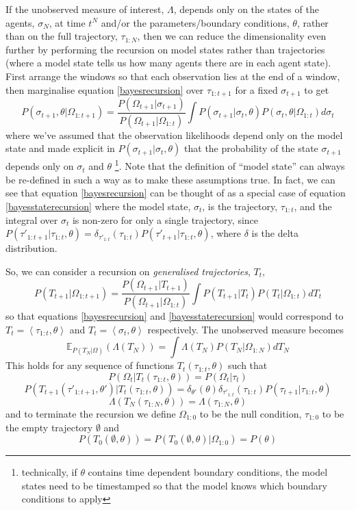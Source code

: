 \documentclass{article}
\begin{document}
If the unobserved measure of interest, $\Lambda$, depends only on the states of the agents, $\sigma_N$, at time $t^N$ and/or the parameters/boundary conditions, $\theta$, rather than on the full trajectory, $\tau_{1:N}$, then we can reduce the dimensionality even further by performing the recursion on model states rather than trajectories (where a model state tells us how many agents there are in each agent state). First arrange the windows so that each observation lies at the end of a window, then marginalise equation \eqref{bayesrecursion} over $\tau_{1:t+1}$ for a fixed $\sigma_{t+1}$ to get
\begin{equation}
P\left(\sigma_{t+1}, \theta | \Omega_{1:t+1}\right)
=
\frac{ P(\Omega_{t+1}|\sigma_{t+1}) 
}
{	P(\Omega_{t+1}| \Omega_{1:t}) }
\int P(\sigma_{t+1}|\sigma_t,\theta)P\left(\sigma_{t},\theta| \Omega_{1:t}\right) d \sigma_t
\label{bayesstaterecursion}
\end{equation}
where we've assumed that the observation likelihoods depend only on the model state and made explicit in $P(\sigma_{t+1}|\sigma_t,\theta)$ that the probability of the state $\sigma_{t+1}$ depends only on $\sigma_t$ and $\theta$  \footnote{technically, if $\theta$ contains time dependent boundary conditions, the model states need to be timestamped so that the model knows which boundary conditions to apply}.   Note that the definition of ``model state'' can always be re-defined in such a way as to make these assumptions true. In fact, we can see that equation \eqref{bayesrecursion} can be thought of as a special case of equation \eqref{bayesstaterecursion} where the model state, $\sigma_t$, is the trajectory, $\tau_{1:t}$, and the integral over $\sigma_t$ is non-zero for only a single trajectory, since $P(\tau'_{1:t+1}|\tau_{1:t},\theta) = \delta_{\tau'_{1:t}}(\tau_{1:t})P(\tau'_{t+1}|\tau_{1:t},\theta)$, where $\delta$ is the delta distribution.

So, we can consider a recursion on \textit{generalised trajectories}, $T_t$,
\begin{equation}
P\left(T_{t+1}| \Omega_{1:t+1}\right)
=
\frac{ P(\Omega_{t+1}|T_{t+1})}
{	P(\Omega_{t+1}| \Omega_{1:t}) }
\int P(T_{t+1}|T_t)P\left(T_{t}| \Omega_{1:t}\right) d T_t
\label{generalisedbayesrecursion}
\end{equation}
so that equations \eqref{bayesrecursion} and \eqref{bayesstaterecursion} would correspond to $T_t=\left<\tau_{1:t},\theta\right>$ and $T_t=\left<\sigma_t,\theta\right>$ respectively. The unobserved measure becomes
\begin{equation}
\mathbb{E}_{P(T_N|\Omega)}(\Lambda(T_N)) = \int \Lambda(T_N) P(T_N|\Omega_{1:N}) dT_N
\end{equation}
This holds for any sequence of functions $T_t(\tau_{1:t},\theta)$ such that 
\[
P(\Omega_t|T_t(\tau_{1:t},\theta)) = P(\Omega_t|\tau_t)
\]
\[
P(T_{t+1}(\tau'_{1:t+1},\theta')|T_{t}(\tau_{1:t},\theta)) = \delta_{\theta'}(\theta)\delta_{\tau'_{1:t}}(\tau_{1:t})P(\tau_{t+1}|\tau_{1:t},\theta)
\]
\[
\Lambda(T_N(\tau_{1:N},\theta)) = \Lambda(\tau_{1:N},\theta)
\]
and to terminate the recursion we define $\Omega_{1:0}$ to be the null condition, $\tau_{1:0}$ to be the empty trajectory $\emptyset$ and
\[
P(T_0(\emptyset,\theta)) = P(T_0(\emptyset,\theta)|\Omega_{1:0}) = P(\theta)
\]
\end{document}
